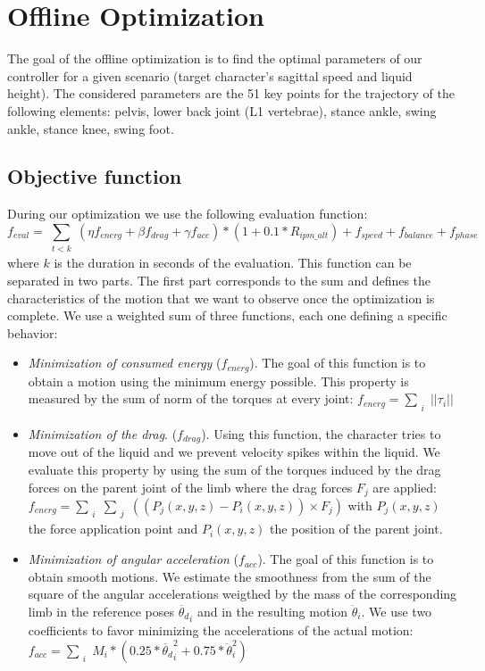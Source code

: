 \documentclass[runningheads,a4paper,10pt]{llncs}
\begin{document}
\section{Offline Optimization}
\label{sec:optimisation}

The goal of the offline optimization is to find the optimal parameters of our controller for a given scenario (target character's sagittal speed and liquid height). The considered parameters are the 51 key points for the trajectory of the following elements: pelvis, lower back joint (L1 vertebrae), stance ankle, swing ankle, stance knee, swing foot.

\subsection{Objective function}
During our optimization we use the following evaluation function:
\begin{equation}
f_{eval} =\sum_{\substack{t<k}} (\eta f_{energ} + \beta f_{drag} + \gamma f_{acc}) *(1+0.1* R_{ipm\_alt}) 
+ f_{speed} + f_{balance} + f_{phase}
\label{eq:complete_eval}
\end{equation}
where $k$ is the duration in seconds of the evaluation. This function can be separated in two parts. The first part corresponds to the sum and defines the characteristics of the motion that we want to observe once the optimization is complete. We use a weighted sum of three functions, each one defining a specific behavior:
\begin{itemize}
\item{\textit{Minimization of consumed energy} ($f_{energ}$). The goal of this function is to obtain a motion using the minimum energy possible. This property is measured by the sum of norm of the torques at every joint: $f_{energ}=\sum_{\substack{i}}{|| \tau_i ||}$} 
\item{\textit{Minimization of the drag}. ($f_{drag}$). Using this function, the character tries to move out of the liquid and we prevent velocity spikes within the liquid. We evaluate this property by using the sum of the torques induced by the drag forces on the parent joint of the limb where the drag forces $F_j$ are applied: $f_{energ}=\sum_{\substack{i}}\sum_{\substack{j}}((P_j(x,y,z)-P_i(x,y,z)) \times F_j)$ with  $P_j(x,y,z)$ the force application point and $P_i(x,y,z)$ the position of the parent joint.}
\item{\textit{Minimization of angular acceleration} ($f_{acc}$). The goal of this function is to obtain smooth motions. We estimate the smoothness from the sum of the square of the angular accelerations weigthed by the mass of the corresponding limb in the reference poses $\ddot{\theta_d}_i$ and in the resulting motion $\ddot{\theta}_i$. We use two coefficients to favor minimizing the accelerations of the actual motion: $f_{acc}=\sum_{\substack{i}}M_i*(0.25*\ddot{\theta_d}_i^2+0.75*\ddot{\theta}_i^2)$ }
\end{itemize}
\end{document}
